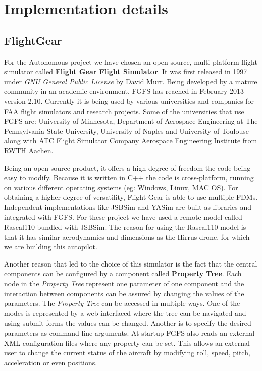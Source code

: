 \chapter{Implementation details}
\label{chapter:implementation-details}

\section{FlightGear}
\label{sec:fgfs}
For the Autonomous project we have chosen an open-source, multi-platform
flight simulator called \textbf{Flight Gear Flight Simulator}. It was first
released in 1997 under \textit{GNU General Public License} by David Murr. Being
developed by a mature community in an academic environment,  FGFS has reached in February 2013 version 2.10. Currently
it is being used by various universities and companies for FAA flight simulators
and research projects. Some of the universities that use FGFS are: University of
Minnesota, Department of Aerospace Engineering at The Pennsylvania State University,
University of Naples and University of Toulouse along with ATC Flight Simulator
Company Aerospace Engineering Institute from RWTH Aachen.


Being an open-source product, it offers a high degree of freedom the code being
easy to modify. Because it is written in C++ the code is cross-platform, running
on various different operating systems (eg: Windows, Linux, MAC OS). For
obtaining a higher degree of versatility, Flight Gear is able to use multiple
FDMs. Independent implementations like
JSBSim and YASim are built as libraries and integrated with FGFS. For these
project we have used a remote model called Rascal110 bundled with JSBSim. The
reason for using the Rascal110 model is that it has similar aerodynamics and
dimensions as the Hirrus drone, for which we are building this autopilot.

Another reason that led to the choice of this simulator is the fact that the 
central components can be configured by a component called \textbf{Property Tree}.
Each node in the \textit{Property Tree} represent one parameter of one component
and the interaction between components can be assured by changing the values of
the parameters. The \textit{Property Tree} can be accessed in multiple ways.
One of the modes is represented by a web interfaced where the tree can be navigated
and using submit forms the values can be changed. Another is to specify the
desired parameters as command line arguments. At startup FGFS also reads an
external XML configuration files where
any property can be set. This allows an external user to change the current
status of the aircraft by modifying roll, speed, pitch, acceleration or even positions.

